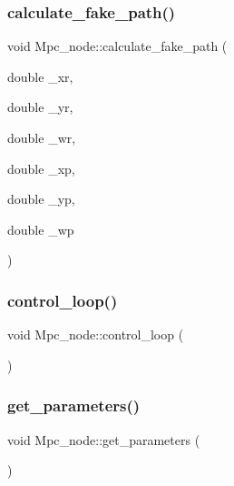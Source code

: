 \subsubsection{\texorpdfstring{calculate\+\_\+fake\+\_\+path()}{calculate\_fake\_path()}}
{\footnotesize\ttfamily void Mpc\+\_\+node\+::calculate\+\_\+fake\+\_\+path (\begin{DoxyParamCaption}\item[{double}]{\+\_\+xr,  }\item[{double}]{\+\_\+yr,  }\item[{double}]{\+\_\+wr,  }\item[{double}]{\+\_\+xp,  }\item[{double}]{\+\_\+yp,  }\item[{double}]{\+\_\+wp }\end{DoxyParamCaption})}

\mbox{\label{classMpc__node_a788f17ed756892727cf04adf1a485677}} 
\subsubsection{\texorpdfstring{control\+\_\+loop()}{control\_loop()}}
{\footnotesize\ttfamily void Mpc\+\_\+node\+::control\+\_\+loop (\begin{DoxyParamCaption}{ }\end{DoxyParamCaption})}

\mbox{\label{classMpc__node_ab607a3c4dfa4ebf571a60c93049e3309}} 
\subsubsection{\texorpdfstring{get\+\_\+parameters()}{get\_parameters()}}
{\footnotesize\ttfamily void Mpc\+\_\+node\+::get\+\_\+parameters (\begin{DoxyParamCaption}{ }\end{DoxyParamCaption})}

\mbox{\label{classMpc__node_a708cd33f3a41aac19d767879d1dc0cd7}} 
